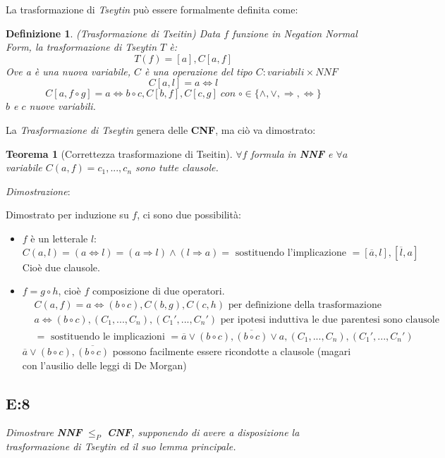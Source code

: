 \documentclass[a4paper]{article}
\newtheorem*{theorem}{Teorema}
\newtheorem*{definition}{Definizione}
\newenvironment{dimostrazione}{\textit{Dimostrazione}:\begin{adjustwidth}{1cm}{}}{\end{adjustwidth}}
\begin{document}
La trasformazione di \textit{Tseytin} può essere formalmente definita come:
\begin{definition}(Trasformazione di Tseitin)
 	Data $f$ funzione in Negation Normal Form, la trasformazione di Tseytin $T$ è:
	$$ T(f) = [a],C[a,f]$$
	Ove a è una nuova variabile, $C$ è una operazione del tipo $C: variabili \times NNF$
	$$C[a,l] = a \Leftrightarrow l$$
	$$C[a,f \circ g] = a \Leftrightarrow b \circ c, C[b,f],C[c,g]\; con \; \circ \in \{\land,\lor, \Rightarrow, \Leftrightarrow\}$$
	$b$ e $c$ nuove variabili.
\end{definition}
La \textit{Trasformazione di Tseytin} genera delle \textbf{CNF}, ma ciò va dimostrato:
\begin{theorem}[Correttezza trasformazione di Tseitin]
	$\forall f $ formula in \textbf{NNF} e $\forall a$ variabile $C(a,f) = c_1,...,c_n$ sono tutte clausole.
\end{theorem}
\begin{dimostrazione}
	Dimostrato per induzione su $f$, ci sono due possibilità:
	\begin{itemize}
		\item $f$ è un letterale $l$:
			\begin{equation*}
			C(a,l) = (a \Leftrightarrow l) = (a \Rightarrow l) \land (l \Rightarrow a)= 
			\text{ sostituendo l'implicazione } = [ \overline a, l],[ \overline l, a]
			\end{equation*}
			Cioè due clausole.
		\item $f = g \circ h$, cioè $f$ composizione di due operatori.
			\begin{align*}
				&C(a,f) = a \Leftrightarrow (b \circ c),C(b,g), C(c,h) \text{ per definizione della trasformazione} \\
				&a \Leftrightarrow (b \circ c), (C_1,...,C_n), (C_1',..., C_n') \text{ per ipotesi induttiva le due parentesi sono clausole}\\
				&= \text{ sostituendo le implicazioni } = \overline a \lor  (b \circ c), \overline{(b \circ c)} \lor a, (C_1,...,C_n), (C_1',..., C_n')
                        \end{align*}
			$\overline a \lor  (b \circ c), \overline{(b \circ c)}$ possono facilmente essere ricondotte a clausole (magari con l'ausilio delle leggi di De Morgan)
	\end{itemize}
\end{dimostrazione}
\subsection{E:8}
\emph{Dimostrare \textbf{NNF} $\leq_P$ \textbf{CNF}, supponendo di avere a disposizione la trasformazione di Tseytin ed il suo lemma principale.}
\end{document}
